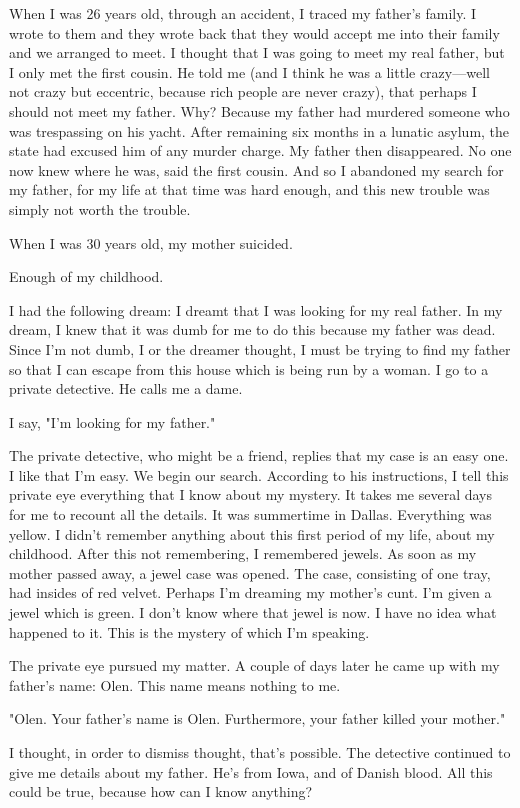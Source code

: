 When I was 26 years old, through an accident, I traced my father's
family. I wrote to them and they wrote back that they would accept me
into their family and we arranged to meet. I thought that I was going to
meet my real father, but I only met the first cousin. He told me (and I
think he was a little crazy---well not crazy but eccentric, because rich
people are never crazy), that perhaps I should not meet my father. Why?
Because my father had murdered someone who was trespassing on his yacht.
After remaining six months in a lunatic asylum, the state had excused
him of any murder charge. My father then disappeared. No one now knew
where he was, said the first cousin. And so I abandoned my search for my
father, for my life at that time was hard enough, and this new trouble
was simply not worth the trouble.

When I was 30 years old, my mother suicided.

Enough of my childhood.

I had the following dream: I dreamt that I was looking for my real
father. In my dream, I knew that it was dumb for me to do this because
my father was dead. Since I'm not dumb, I or the dreamer thought, I must
be trying to find my father so that I can escape from this house which
is being run by a woman. I go to a private detective. He calls me a
dame.

I say, "I'm looking for my father."

The private detective, who might be a friend, replies that my case is an
easy one. I like that I'm easy. We begin our search. According to his
instructions, I tell this private eye everything that I know about my
mystery. It takes me several days for me to recount all the details. It
was summertime in Dallas. Everything was yellow. I didn't remember
anything about this first period of my life, about my childhood. After
this not remembering, I remembered jewels. As soon as my mother passed
away, a jewel case was opened. The case, consisting of one tray, had
insides of red velvet. Perhaps I'm dreaming my mother's cunt. I'm given
a jewel which is green. I don't know where that jewel is now. I have no
idea what happened to it. This is the mystery of which I'm speaking.

The private eye pursued my matter. A couple of days later he came up
with my father's name: Olen. This name means nothing to me.

"Olen. Your father's name is Olen. Furthermore, your father killed your
mother."

I thought, in order to dismiss thought, that's possible. The detective
continued to give me details about my father. He's from Iowa, and of
Danish blood. All this could be true, because how can I know anything?

